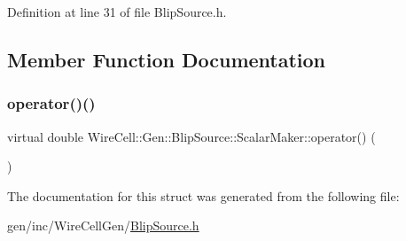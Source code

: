 Definition at line 31 of file Blip\+Source.\+h.



\subsection{Member Function Documentation}
\mbox{\label{struct_wire_cell_1_1_gen_1_1_blip_source_1_1_scalar_maker_a890bdec9160e2786391285b7f98a5453}} 
\subsubsection{\texorpdfstring{operator()()}{operator()()}}
{\footnotesize\ttfamily virtual double Wire\+Cell\+::\+Gen\+::\+Blip\+Source\+::\+Scalar\+Maker\+::operator() (\begin{DoxyParamCaption}{ }\end{DoxyParamCaption})\hspace{0.3cm}{\ttfamily [pure virtual]}}



The documentation for this struct was generated from the following file\+:\begin{DoxyCompactItemize}
\item 
gen/inc/\+Wire\+Cell\+Gen/\hyperlink{_blip_source_8h}{Blip\+Source.\+h}\end{DoxyCompactItemize}
